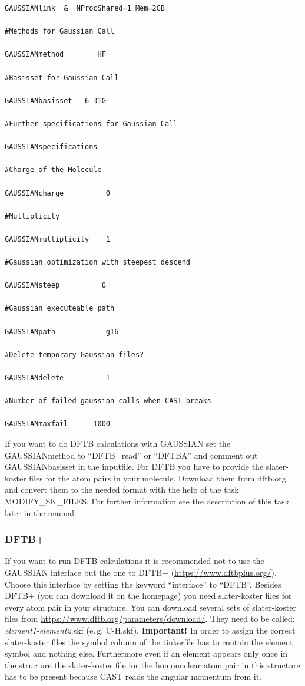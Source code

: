 \documentclass[10pt,a4paper]{article} %
\begin{document}
\begin{lstlisting}
GAUSSIANlink  &  NProcShared=1 Mem=2GB

#Methods for Gaussian Call

GAUSSIANmethod        HF

#Basisset for Gaussian Call

GAUSSIANbasisset   6-31G   

#Further specifications for Gaussian Call

GAUSSIANspecifications 

#Charge of the Molecule

GAUSSIANcharge          0

#Multiplicity 

GAUSSIANmultiplicity    1

#Gaussian optimization with steepest descend 

GAUSSIANsteep          0

#Gaussian executeable path 

GAUSSIANpath            g16

#Delete temporary Gaussian files?

GAUSSIANdelete          1

#Number of failed gaussian calls when CAST breaks

GAUSSIANmaxfail      1000
\end{lstlisting}

If you want to do DFTB calculations with GAUSSIAN set the GAUSSIANmethod to ``DFTB=read'' or ``DFTBA'' and comment out GAUSSIANbasisset in the inputfile. For DFTB you have to provide the slater-koster files for the atom pairs in your molecule. Download them from dftb.org and convert them to the needed format with the help of the task MODIFY\_SK\_FILES. For further information see the description of this task later in the manual.

\subsubsection{DFTB+}

If you want to run DFTB calculations it is recommended not to use the GAUSSIAN interface but the one to DFTB+ (\url{https://www.dftbplus.org/}). Choose this interface by setting the keyword ``interface'' to ``DFTB''. Besides DFTB+ (you can download it on the homepage) you need slater-koster files for every atom pair in your structure. You can download several sets of slater-koster files from \url{https://www.dftb.org/parameters/download/}. They need to be called: \textit{element1}-\textit{element2}.skf (e.\,g. C-H.skf). \textbf{Important!} In order to assign the correct slater-koster files the symbol column of the tinkerfile has to contain the element symbol and nothing else. Furthermore even if an element appears only once in the structure the slater-koster file for the homonuclear atom pair in this structure has to be present because CAST reads the angular momentum from it.
\end{document}

